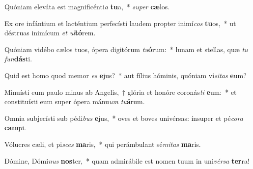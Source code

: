 \item Quóniam eleváta est magnificénti\textit{a} \textbf{tu}a,~* \textit{su}\textit{per} \textbf{cæ}los.
\item Ex ore infántium et lacténtium perfecísti laudem propter inimí\textit{cos} \textbf{tu}os,~* ut déstruas inimícum \textit{et} \textit{ul}\textbf{tó}rem.
\item Quóniam vidébo cælos tuos, ópera digitórum \textit{tu}\textbf{ó}rum:~* lunam et stellas, quæ \textit{tu} \textit{fun}\textbf{dás}ti.
\item Quid est homo quod memor \textit{es} \textbf{e}jus?~* aut fílius hóminis, quóniam ví\textit{si}\textit{tas} \textbf{e}um?
\item Minuísti eum paulo minus ab Angelis,~† glória et honóre coronás\textit{ti} \textbf{e}um:~* et constituísti eum super ópera mánu\textit{um} \textit{tu}\textbf{á}rum.
\item Omnia subjecísti sub pédi\textit{bus} \textbf{e}jus,~* oves et boves univérsas: ínsuper et pé\textit{co}\textit{ra} \textbf{cam}pi.
\item Vólucres cæli, et pi\textit{sces} \textbf{ma}ris,~* qui perámbulant sé\textit{mi}\textit{tas} \textbf{ma}ris.
\item Dómine, Dómi\textit{nus} \textbf{nos}ter,~* quam admirábile est nomen tuum in uni\textit{vér}\textit{sa} \textbf{ter}ra!
